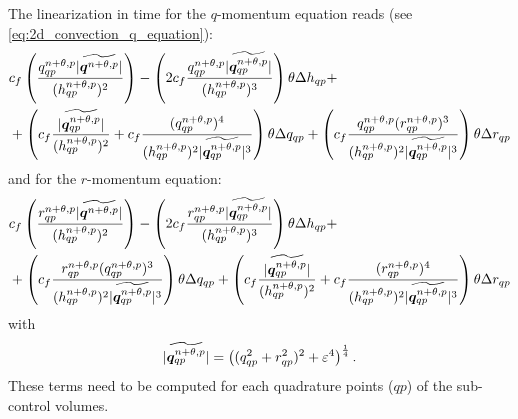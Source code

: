 The linearization in time for the $q$-momentum equation reads (see \autoref{eq:2d_convection_q_equation}):
\begin{align}
        &c_f \left( \frac{q^{n+\theta,p}_{qp}\lvert \widetilde{\bm{q}^{n+\theta,p}} \rvert}{(h^{n+\theta,p}_{qp})^2} \right)
        - \left( 2 c_f \frac{ q^{n+\theta,p}_{qp} \lvert \widetilde{\bm{q}^{n+\theta,p}_{qp}} \rvert }{(h^{n+\theta,p}_{qp})^3} \right) \theta \Delta h_{qp} +
        \\*
        & +
        \left( c_f \frac{\lvert \widetilde{\bm{q}^{n+\theta,p}_{qp}} \rvert}{(h^{n+\theta,p}_{qp})^2} + c_f \frac{(q^{n+\theta,p}_{qp})^4}{(h^{n+\theta,p}_{qp})^2\lvert \widetilde{\bm{q}^{n+\theta,p}_{qp}} \rvert^3} \right) \theta \Delta q_{qp}
        + \left( c_f \frac{q^{n+\theta,p}_{qp}(r^{n+\theta,p}_{qp})^3}
        {(h^{n+\theta,p}_{qp})^2\lvert \widetilde{\bm{q}^{n+\theta,p}_{qp}} \rvert^3 } \right) \theta \Delta r_{qp}
 \end{align}
and for the $r$-momentum equation:
\begin{align}
        &c_f \left( \frac{r^{n+\theta,p}_{qp}\lvert \widetilde{\bm{q}^{n+\theta,p}} \rvert}{(h^{n+\theta,p}_{qp})^2} \right)
        - \left( 2 c_f \frac{ r^{n+\theta,p}_{qp} \lvert \widetilde{\bm{q}^{n+\theta,p}_{qp}} \rvert} {(h^{n+\theta,p}_{qp})^3} \right) \theta \Delta h_{qp} +
        \\*
        & + \left( c_f \frac{r^{n+\theta,p}_{qp}(q^{n+\theta,p}_{qp})^3}
        {(h^{n+\theta,p}_{qp})^2\lvert \widetilde{\bm{q}^{n+\theta,p}_{qp}} \rvert^3 }\right) \theta \Delta q_{qp}
        + \left( c_f \frac{\lvert \widetilde{\bm{q}^{n+\theta,p}_{qp}} \rvert}{(h^{n+\theta,p}_{qp})^2}
        + c_f \frac{(r^{n+\theta,p}_{qp})^4}{(h^{n+\theta,p}_{qp})^2\lvert \widetilde{\bm{q}^{n+\theta,p}_{qp}} \rvert^3} \right) \theta \Delta r_{qp}
\end{align}
with
\begin{align}
    \lvert \widetilde{\bm{q}^{n+\theta,p}_{qp}} \rvert = \left( (q^2_{qp} + r^2_{qp})^2 + \varepsilon^4 \right)^{\frac{1}{4}}.
\end{align}
These terms need to be computed for each quadrature points ($qp$) of the sub-control volumes.
